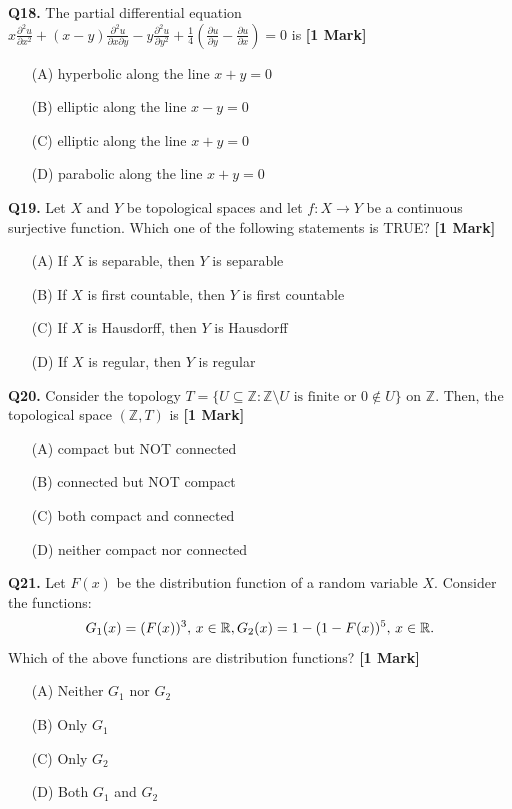 \documentclass[11pt]{article}
\newcommand{\questiona}[2]{
    \noindent\textbf{Q#2.} #1 \hfill \textbf{[1 Mark]}
}
\begin{document}
\questiona{The partial differential equation \( x \frac{\partial^2 u}{\partial x^2} + (x - y) \frac{\partial^2 u}{\partial x \partial y} - y \frac{\partial^2 u}{\partial y^2} + \frac{1}{4} \left( \frac{\partial u}{\partial y} - \frac{\partial u}{\partial x} \right) = 0 \) is}{18}
\begin{enumerate}
    \item[(A)] hyperbolic along the line \( x + y = 0 \)  
    \item[(B)] elliptic along the line \( x - y = 0 \)  
    \item[(C)] elliptic along the line \( x + y = 0 \)  
    \item[(D)] parabolic along the line \( x + y = 0 \)  
\end{enumerate}
\vspace{0.5cm}

\questiona{Let \( X \) and \( Y \) be topological spaces and let \( f: X \to Y \) be a continuous surjective function. Which one of the following statements is TRUE?}{19}
\begin{enumerate}
    \item[(A)] If \( X \) is separable, then \( Y \) is separable  
    \item[(B)] If \( X \) is first countable, then \( Y \) is first countable  
    \item[(C)] If \( X \) is Hausdorff, then \( Y \) is Hausdorff  
    \item[(D)] If \( X \) is regular, then \( Y \) is regular  
\end{enumerate}
\vspace{0.5cm}

\questiona{Consider the topology \( T = \{ U \subseteq \mathbb{Z} : \mathbb{Z} \setminus U \text{ is finite or } 0 \notin U \} \) on \( \mathbb{Z} \). Then, the topological space \( (\mathbb{Z}, T) \) is}{20}
\begin{enumerate}
    \item[(A)] compact but NOT connected  
    \item[(B)] connected but NOT compact  
    \item[(C)] both compact and connected  
    \item[(D)] neither compact nor connected  
\end{enumerate}
\vspace{0.5cm}

\questiona{Let \( F(x) \) be the distribution function of a random variable \( X \). Consider the functions: \[G_1(x) = (F(x))^3, \, x \in \mathbb{R}, \\ G_2(x) = 1 - (1 - F(x))^5, \, x \in \mathbb{R}.\] Which of the above functions are distribution functions?}{21}
\begin{enumerate}
    \item[(A)] Neither \( G_1 \) nor \( G_2 \)  
    \item[(B)] Only \( G_1 \)  
    \item[(C)] Only \( G_2 \)  
    \item[(D)] Both \( G_1 \) and \( G_2 \)  
\end{enumerate}
\vspace{0.5cm}
\end{document}
